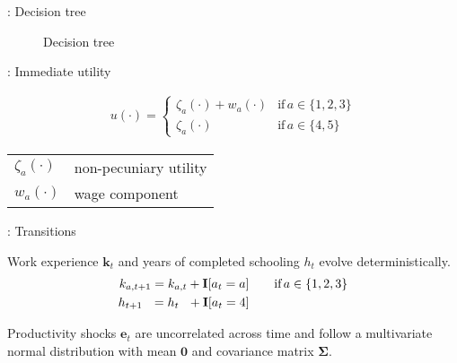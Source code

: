 \begin{frame}{\insertsection: Decision tree}
\begin{figure}
  \scalebox{0.55}{}
  \caption{Decision tree}
\end{figure}
\end{frame}
\begin{frame}{\insertsection: Immediate utility}

  \begin{align*}
  u(\cdot) =
  \begin{cases}
      \zeta_a(\cdot)  + w_a(\cdot)                & \text{if}\, a \in \{1, 2, 3\}  \\
      \zeta_a(\cdot)                                                  &  \text{if}\, a \in \{4, 5\}
  \end{cases}
  \end{align*}

\begin{table}[]
	\hskip1.5cm
	\begin{tabular}{ll}
	$\zeta_a(\cdot)$	& non-pecuniary utility \\[1.0em]
	$w_a(\cdot) $	& wage component
	\end{tabular}
\end{table}


\end{frame}
\begin{frame}{\insertsection: Transitions}

  Work experience $\bm{k}_t$  and years of completed schooling $h_t$ evolve deterministically.
  \begin{align*}
  k_{a,t+1} = k_{a,t} + {\textbf{I}}[a_t = a]  &\qquad \text{if}\, a \in \{1, 2, 3\} \\
  h_{t + 1\phantom{,a}} = h_{t\phantom{,a}} +   {\textbf{I}}[a_t = 4]  &\qquad
  \end{align*}

  Productivity shocks $\bm{e}_t$ are uncorrelated across time and follow a multivariate normal distribution with mean $\bm{0}$ and covariance matrix $\bm{\Sigma}$.
  

\end{frame}
